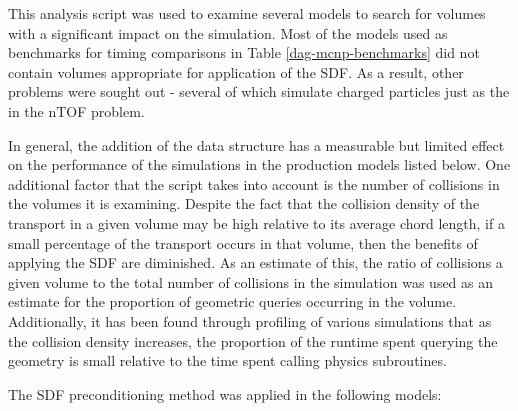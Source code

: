 This analysis script was used to examine several models to search for volumes
with a significant impact on the simulation. Most of the models used as
benchmarks for timing comparisons in Table \ref{dag-mcnp-benchmarks} did not
contain volumes appropriate for application of the SDF. As a result, other
problems were sought out - several of which simulate charged particles just as
the in the nTOF problem.

In general, the addition of the data structure has a measurable but limited
effect on the performance of the simulations in the production models listed
below. One additional factor that the script takes into account is the number of
collisions in the volumes it is examining. Despite the fact that the collision
density of the transport in a given volume may be high relative to its average
chord length, if a small percentage of the transport occurs in that volume, then
the benefits of applying the SDF are diminished. As an estimate of this, the
ratio of collisions a given volume to the total number of collisions in the
simulation was used as an estimate for the proportion of geometric queries
occurring in the volume.  Additionally, it has been found through profiling of
various simulations that as the collision density increases, the proportion of the
runtime spent querying the geometry is small relative to the time spent calling
physics subroutines.

The SDF preconditioning method was applied in the following models:





